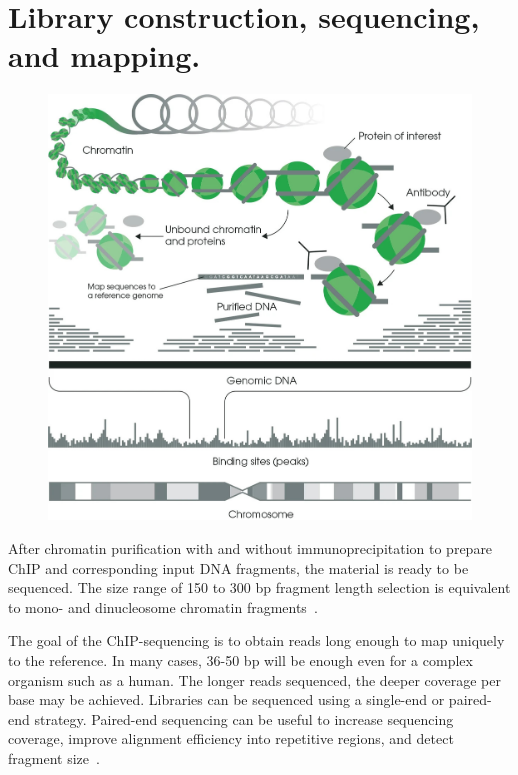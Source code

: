\section{Library construction, sequencing, and mapping.}

\begin{figure}[b!]
    \centering
    \includegraphics[width=\textwidth]{../img/chip.jpeg}
    \label{fig:graph_classes}
\end{figure}


After chromatin purification with and without immunoprecipitation to prepare ChIP and corresponding input DNA fragments, the material is ready to be sequenced. 
The size range of 150 to 300 bp fragment length selection is equivalent to mono- and dinucleosome chromatin fragments~\cite{kidder2011chip}.

The goal of the ChIP-sequencing is to obtain reads long enough to map uniquely to the reference.  
In many cases, 36-50 bp will be enough even for a complex organism such as a human. 
The longer reads sequenced, the deeper coverage per base may be achieved.
Libraries can be sequenced using a single-end or paired-end strategy. 
Paired-end sequencing can be useful to increase sequencing coverage, improve alignment efficiency into repetitive regions, and detect fragment size~\cite{kidder2011chip, chen2012systematic}.





